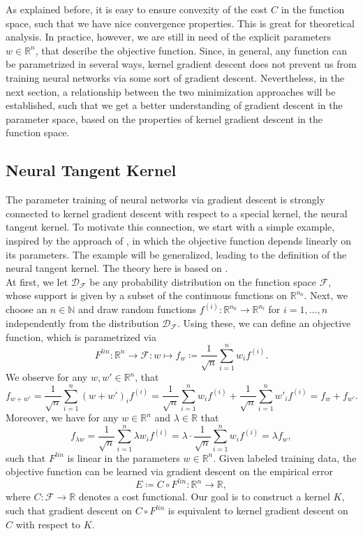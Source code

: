 \documentclass[11pt, a4paper]{article}
\newcommand{\N}{\mathbb{N}}
\newcommand{\R}{\mathbb{R}}
\newcommand{\D}{\mathcal{D}}
\newcommand{\F}{\mathcal{F}}
\begin{document}
As explained before, it is easy to ensure convexity of the cost $C$ in the function space, such that we have nice convergence properties. This is great for theoretical analysis. In practice, however, we are still in need of the explicit parameters $w \in \R^n$, that describe the objective function. Since, in general, any function can be parametrized in several ways, kernel gradient descent does not prevent us from training neural networks via some sort of gradient descent. Nevertheless, in the next section, a relationship between the two minimization approaches will be established, such that we get a better understanding of gradient descent in the parameter space, based on the properties of kernel gradient descent in the function space.

\subsection{Neural Tangent Kernel}

The parameter training of neural networks via gradient descent is strongly connected to kernel gradient descent with respect to a special kernel, the neural tangent kernel. To motivate this connection, we start with a simple example, inspired by the approach of \cite{Features}, in which the objective function depends linearly on its parameters. The example will be generalized, leading to the definition of the neural tangent kernel. The theory here is based on \cite{NTK}. \\

At first, we let $\D_{\F}$ be any probability distribution on the function space $\F$, whose support is given by a subset of the continuous functions on $\R^{n_0}$. Next, we choose an $n \in \N$ and draw random functions $f^{(i)} : \R^{n_0} \to \R^{n_l}$ for $i=1,\dots,n$ independently from the distribution $\D_{\F}$. Using these, we can define an objective function, which is parametrized via
\[ F^\textit{lin}: \R^n \to \F : w \mapsto f_w \coloneq \frac{1}{\sqrt{n}} \sum_{i=1}^{n}w_if^{(i)}. \]
We observe for any $w, w' \in \R^n$, that
\[ f_{w + w'} = \frac{1}{\sqrt{n}} \sum_{i=1}^{n}(w+ w')_if^{(i)} = \frac{1}{\sqrt{n}} \sum_{i=1}^{n}w_if^{(i)} + \frac{1}{\sqrt{n}} \sum_{i=1}^{n}w'_if^{(i)} = f_w + f_{w'}. \]
Moreover, we have for any $w \in \R^n$ and $\lambda \in \R$ that 
\[ f_{\lambda w} = \frac{1}{\sqrt{n}} \sum_{i=1}^{n}\lambda w_if^{(i)} = \lambda \cdot \frac{1}{\sqrt{n}} \sum_{i=1}^{n} w_if^{(i)} = \lambda f_w, \]
such that $F^\textit{lin}$ is linear in the parameters $w \in \R^n$. Given labeled training data, the objective function can be learned via gradient descent on the empirical error
\[ E \coloneq C \circ F^\textit{lin}: \R^n \to \R, \]
where $C: \F \to \R$ denotes a cost functional. Our goal is to construct a kernel $K$, such that gradient descent on $C \circ F^\textit{lin}$ is equivalent to kernel gradient descent on $C$ with respect to $K$. \\
\end{document}
